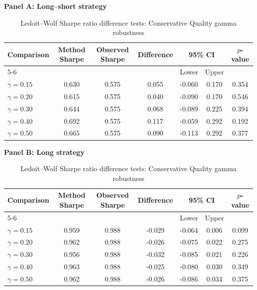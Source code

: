 \begin{table}[H]
\centering
\footnotesize
\renewcommand{\arraystretch}{1.12}
\setlength{\tabcolsep}{4pt}
\caption{Ledoit--Wolf Sharpe ratio difference tests: Conservative Quality gamma robustness}
\label{tab:conservative_gamma_sharpe_difference_tests}
\begin{threeparttable}
{\centering\textbf{Panel A: Long--short strategy}\par}
\vspace{0.4em}
\begin{tabular*}{\textwidth}{@{\extracolsep{\fill}}lcccccc}
\toprule
Comparison & Method Sharpe & Observed Sharpe & Difference & \multicolumn{2}{c}{95\% CI} & $p$-value \\
\cmidrule(lr){5-6}
& & & & Lower & Upper & \\
\midrule
$\gamma=0.15$ & 0.630 & 0.575 & 0.055 & -0.060 & 0.170 & 0.354 \\
$\gamma=0.20$ & 0.615 & 0.575 & 0.040 & -0.090 & 0.170 & 0.546 \\
$\gamma=0.30$ & 0.644 & 0.575 & 0.068 & -0.089 & 0.225 & 0.394 \\
$\gamma=0.40$ & 0.692 & 0.575 & 0.117 & -0.059 & 0.292 & 0.192 \\
$\gamma=0.50$ & 0.665 & 0.575 & 0.090 & -0.113 & 0.292 & 0.377 \\
\bottomrule
\end{tabular*}
\vspace{1em}
{\centering\textbf{Panel B: Long strategy}\par}
\vspace{0.4em}
\begin{tabular*}{\textwidth}{@{\extracolsep{\fill}}lcccccc}
\toprule
Comparison & Method Sharpe & Observed Sharpe & Difference & \multicolumn{2}{c}{95\% CI} & $p$-value \\
\cmidrule(lr){5-6}
& & & & Lower & Upper & \\
\midrule
$\gamma=0.15$ & 0.959 & 0.988 & -0.029 & -0.064 & 0.006 & 0.099 \\
$\gamma=0.20$ & 0.962 & 0.988 & -0.026 & -0.075 & 0.022 & 0.275 \\
$\gamma=0.30$ & 0.956 & 0.988 & -0.032 & -0.085 & 0.021 & 0.226 \\
$\gamma=0.40$ & 0.963 & 0.988 & -0.025 & -0.080 & 0.030 & 0.349 \\
$\gamma=0.50$ & 0.962 & 0.988 & -0.026 & -0.086 & 0.034 & 0.375 \\
\bottomrule
\end{tabular*}
\begin{tablenotes}[flushleft]

\end{tablenotes}
\end{threeparttable}
\end{table}
